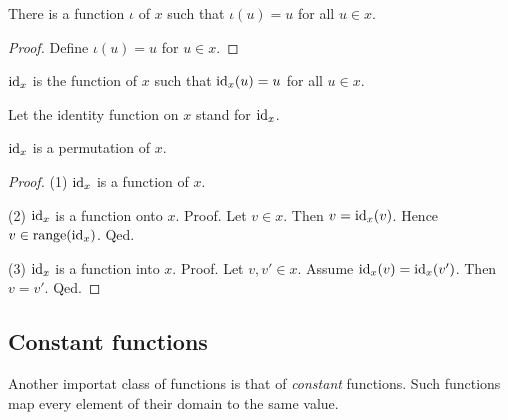 \documentclass[../../set-theory.ftl.tex]{subfiles}
\begin{document}
  \begin{forthel}
    \begin{lemma}
      There is a function $\iota$ of $x$ such that $\iota(u) = u$ for all $u \in x$.
    \end{lemma}
    \begin{proof}
      Define $\iota(u) = u$ for $u \in x$.
    \end{proof}

    \begin{definition}
      $\operatorname{id}_{x}$ is the function of $x$ such that $\operatorname{id}_{x}(u) = u$ for all $u \in x$.
    \end{definition}

    Let the identity function on $x$ stand for $\operatorname{id}_{x}$.

    \begin{proposition}\label{SetTheory_02_01_848243}
      $\operatorname{id}_{x}$ is a permutation of $x$.
    \end{proposition}
    \begin{proof}
      (1) $\operatorname{id}_{x}$ is a function of $x$.

      (2) $\operatorname{id}_{x}$ is a function onto $x$.
      Proof.
        Let $v \in x$.
        Then $v = \operatorname{id}_{x}(v)$.
        Hence $v \in \operatorname{range}(\operatorname{id}_{x})$.
      Qed.

      (3) $\operatorname{id}_{x}$ is a function into $x$.
      Proof.
        Let $v,v' \in x$.
        Assume $\operatorname{id}_{x}(v) = \operatorname{id}_{x}(v')$.
        Then $v = v'$.
      Qed.
    \end{proof}
  \end{forthel}


  \subsection{Constant functions}

  Another importat class of functions is that of \textit{constant} functions.
  Such functions map every element of their domain to the same value.
\end{document}
